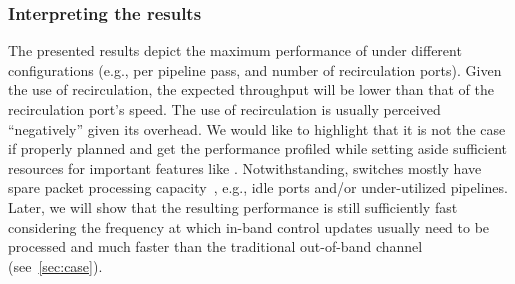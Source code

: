 \subsubsection{Interpreting the results}
The presented results depict the maximum performance of \sysname under different configurations (e.g., \pround per pipeline pass, and number of recirculation ports).
Given the use of recirculation, the expected throughput will be lower than that of the recirculation port's speed.
The use of recirculation is usually perceived ``negatively'' given its overhead. 
We would like to highlight that it is not the case if properly planned and get the performance profiled while setting aside sufficient resources for important features like \sysname. 
Notwithstanding, switches mostly have spare packet processing capacity~\cite{sqr2019icnp}, e.g., idle ports and/or under-utilized pipelines.
Later, we will show that the resulting performance is still sufficiently fast
considering the frequency at which in-band control updates usually need to be processed and much faster than the traditional out-of-band channel (see~\cref{sec:case}).









